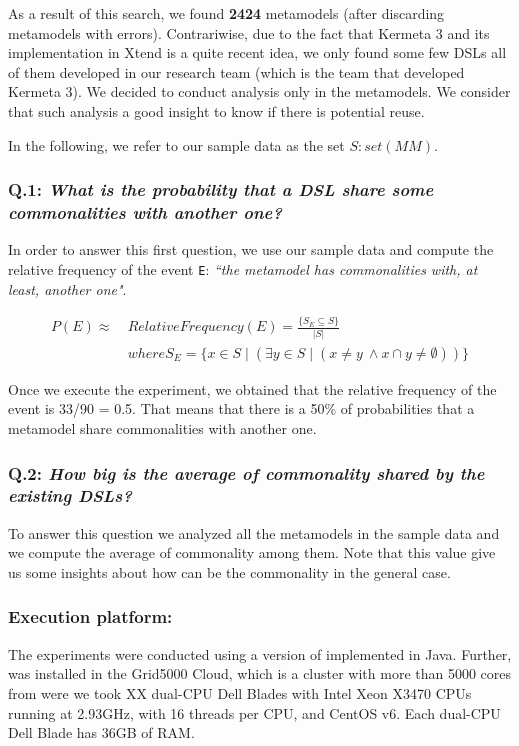 As a result of this search, we found \textbf{2424} metamodels (after discarding metamodels with errors). Contrariwise, due to the fact that Kermeta 3 and its implementation in Xtend is a quite recent idea, we only found some few DSLs all of them developed in our research team (which is the team that developed Kermeta 3). We decided to conduct analysis only in the metamodels. We consider that such analysis a good insight to know if there is potential reuse. 

In the following, we refer to our sample data as the set $S : set(MM)$.

\vspace{-3mm}
\subsubsection{Q.1: \textit{What is the probability that a DSL share some commonalities with another one?}} In order to answer this first question, we use our sample data and compute the relative frequency of the event \texttt{E}: \textit{``the metamodel has commonalities with, at least, another one"}.

\begin{equation}
\begin{split}
P(E) \approx ~ & Relative Frequency (E) = \frac{\{S_{E} \subseteq S \}}{|S|}\\
& where S_{E} = \{x \in S \mid (\exists y \in S \mid (x \neq y ~ \wedge x \cap y \neq \emptyset )) \}
\end{split}
\end{equation}

Once we execute the experiment, we obtained that the relative frequency of the event is 33/90 = 0.5. That means that there is a 50\% of probabilities that a metamodel share commonalities with another one. 

\vspace{-3mm}
\subsubsection{Q.2: \textit{How big is the average of commonality shared by the existing DSLs?}} To answer this question we analyzed all the metamodels in the sample data and we compute the average of commonality among them. Note that this value give us some insights about how can be the commonality in the general case. 

\vspace{-3mm}
\subsubsection{Execution platform:} The experiments were conducted using a version of \toolname implemented in Java. Further, \toolname was installed in the Grid5000 Cloud, which is a cluster with more than 5000 cores from were we took XX dual-CPU Dell Blades with Intel Xeon X3470 CPUs running at 2.93GHz, with 16 threads 
per CPU, and CentOS v6. Each dual-CPU Dell Blade has 36GB of RAM. 


